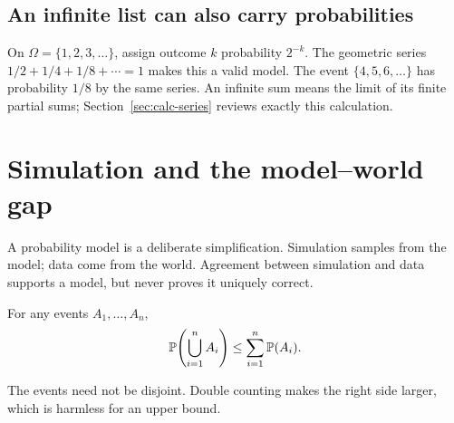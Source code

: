 \subsection*{An infinite list can also carry probabilities}
On $\Omega=\{1,2,3,\ldots\}$, assign outcome $k$ probability $2^{-k}$.
The geometric series $1/2+1/4+1/8+\cdots=1$ makes this a valid model.
The event $\{4,5,6,\ldots\}$ has probability $1/8$ by the same series.
An infinite sum means the limit of its finite partial sums;
Section~\ref{sec:calc-series} reviews exactly this calculation.

\section{Simulation and the model--world gap}

A probability model is a deliberate simplification. Simulation samples from the model; data come from the world. Agreement between simulation and data supports a model, but never proves it uniquely correct.

\begin{theorem}
For any events $A_1,\ldots,A_n$,
\[
\P\!\left(\bigcup_{i=1}^n A_i\right)\le \sum_{i=1}^n\P(A_i).
\]
\end{theorem}

The events need not be disjoint. Double counting makes the right side larger, which is harmless for an upper bound.

